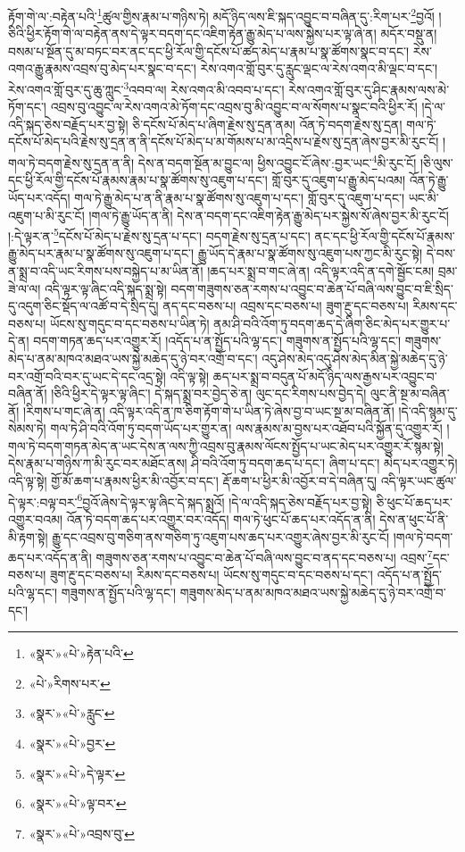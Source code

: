 རྟོག་གེ་ལ་:བརྟེན་པའི་\footnote{«སྣར་»«པེ་»རྟེན་པའི་}ཚུལ་གྱིས་རྣམ་པ་གཉིས་ཏེ། མདོ་ཉིད་ལས་ཇི་སྐད་འབྱུང་བ་བཞིན་དུ་:རིག་པར་\footnote{«པེ་»རིགས་པར་}བྱའོ། །ཅིའི་ཕྱིར་རྟོག་གེ་ལ་བརྟེན་ནས་དེ་ལྟར་བདག་དང་འཇིག་རྟེན་རྒྱུ་མེད་པ་ལས་སྐྱེས་པར་ལྟ་ཞེ་ན། མདོར་བསྡུ་ན། བསམ་པ་སྔོན་དུ་མ་བཏང་བར་ནང་དང་ཕྱི་རོལ་གྱི་དངོས་པོ་ཚད་མེད་པ་རྣམ་པ་སྣ་ཚོགས་སྣང་བ་དང་། རེས་འགའ་རྒྱུ་རྣམས་འབྲས་བུ་མེད་པར་སྣང་བ་དང་། རེས་འགའ་གློ་བུར་དུ་རླུང་ལྡང་ལ་རེས་འགའ་མི་ལྡང་བ་དང་། རེས་འགའ་གློ་བུར་དུ་ཆུ་ཀླུང་\footnote{«སྣར་»«པེ་»རླུང་}འབབ་ལ། རེས་འགའ་མི་འབབ་པ་དང་། རེས་འགའ་གློ་བུར་དུ་ཤིང་རྣམས་ལས་མེ་ཏོག་དང་། འབྲས་བུ་འབྱུང་ལ་རེས་འགའ་མེ་ཏོག་དང་འབྲས་བུ་མི་འབྱུང་བ་ལ་སོགས་པ་སྣང་བའི་ཕྱིར་རོ། །དེ་ལ་འདི་སྐད་ཅེས་བརྗོད་པར་བྱ་སྟེ། ཅི་དངོས་པོ་མེད་པ་ཞིག་རྗེས་སུ་དྲན་ནམ། འོན་ཏེ་བདག་རྗེས་སུ་དྲན། གལ་ཏེ་དངོས་པོ་མེད་པའི་རྗེས་སུ་དྲན་ན་ནི་དངོས་པོ་མེད་པ་མ་གོམས་པ་མ་འདྲིས་པ་རྗེས་སུ་དྲན་ཞེས་བྱར་མི་རུང་ངོ། །གལ་ཏེ་བདག་རྗེས་སུ་དྲན་ན་ནི། དེས་ན་བདག་སྔོན་མ་བྱུང་ལ། ཕྱིས་འབྱུང་ངོ་ཞེས་:བྱར་ཡང་\footnote{«སྣར་»«པེ་»བྱར་}མི་རུང་ངོ། །ཅི་ལུས་དང་ཕྱི་རོལ་གྱི་དངོས་པོ་རྣམས་རྣམ་པ་སྣ་ཚོགས་སུ་འཇུག་པ་དང་། གློ་བུར་དུ་འཇུག་པ་རྒྱུ་མེད་པའམ། འོན་ཏེ་རྒྱུ་ཡོད་པར་འདོད། གལ་ཏེ་རྒྱུ་མེད་པ་ན་ནི་རྣམ་པ་སྣ་ཚོགས་སུ་འཇུག་པ་དང་། གློ་བུར་དུ་འཇུག་པ་དང་། ཡང་མི་འཇུག་པ་མི་རུང་ངོ། །གལ་ཏེ་རྒྱུ་ཡོད་ན་ནི། དེས་ན་བདག་དང་འཇིག་རྟེན་རྒྱུ་མེད་པར་སྐྱེས་སོ་ཞེས་བྱར་མི་རུང་ངོ། །:དེ་ལྟར་ན་\footnote{«སྣར་»«པེ་»དེ་ལྟར་}དངོས་པོ་མེད་པ་རྗེས་སུ་དྲན་པ་དང་། བདག་རྗེས་སུ་དྲན་པ་དང་། ནང་དང་ཕྱི་རོལ་གྱི་དངོས་པོ་རྣམས་རྒྱུ་མེད་པར་རྣམ་པ་སྣ་ཚོགས་སུ་འཇུག་པ་དང་། རྒྱུ་ཡོད་དེ་རྣམ་པ་སྣ་ཚོགས་སུ་འཇུག་པས་ཀྱང་མི་རུང་སྟེ། དེ་བས་ན་སྨྲ་བ་འདི་ཡང་རིགས་པས་བསྐྱེད་པ་མ་ཡིན་ནོ། །ཆད་པར་སྨྲ་བ་གང་ཞེ་ན། འདི་ལྟར་འདི་ན་དགེ་སྦྱོང་ངམ། བྲམ་ཟེ་ལ་ལ། འདི་ལྟར་ལྟ་ཞིང་འདི་སྐད་སྨྲ་སྟེ། བདག་གཟུགས་ཅན་རགས་པ་འབྱུང་བ་ཆེན་པོ་བཞི་ལས་བྱུང་བ་ཇི་སྲིད་དུ་འདུག་ཅིང་སྡོད་ལ་འཚོ་བ་དེ་སྲིད་དུ། ནད་དང་བཅས་པ། འབྲས་དང་བཅས་པ། ཟུག་རྔུ་དང་བཅས་པ། རིམས་དང་བཅས་པ། ཡོངས་སུ་གདུང་བ་དང་བཅས་པ་ཡིན་ཏེ། ནམ་ཤི་བའི་འོག་ཏུ་བདག་ཆད་དེ་ཞིག་ཅིང་མེད་པར་གྱུར་པ་དེ་ན། བདག་གཏན་ཆད་པར་འགྱུར་རོ། །འདོད་པ་ན་སྤྱོད་པའི་ལྷ་དང་། གཟུགས་ན་སྤྱོད་པའི་ལྷ་དང་། གཟུགས་མེད་པ་ནམ་མཁའ་མཐའ་ཡས་སྐྱེ་མཆེད་དུ་ཉེ་བར་འགྲོ་བ་དང་། འདུ་ཤེས་མེད་འདུ་ཤེས་མེད་མིན་སྐྱེ་མཆེད་དུ་ཉེ་བར་འགྲོ་བའི་བར་དུ་ཡང་དེ་དང་འདྲ་སྟེ། འདི་ལྟ་སྟེ། ཆད་པར་སྨྲ་བ་བདུན་པོ་མདོ་ཉིད་ལས་རྒྱས་པར་འབྱུང་བ་བཞིན་ནོ། །ཅིའི་ཕྱིར་དེ་ལྟར་ལྟ་ཞིང་། དེ་སྐད་སྨྲ་བར་བྱེད་ཅེ་ན། ལུང་དང་རིགས་པས་བྱེད་དེ། ལུང་ནི་སྔ་མ་བཞིན་ནོ། །རིགས་པ་གང་ཞེ་ན། འདི་ལྟར་འདི་ན་ཁ་ཅིག་རྟོག་གེ་པ་ཡིན་ཏེ་ཞེས་བྱ་བ་ཡང་སྔ་མ་བཞིན་ནོ། །དེ་འདི་སྙམ་དུ་སེམས་ཏེ། གལ་ཏེ་ཤི་བའི་འོག་ཏུ་བདག་ཡོད་པར་གྱུར་ན། ལས་རྣམས་མ་བྱས་པར་འཐོབ་པའི་སྐྱོན་དུ་འགྱུར་རོ། །གལ་ཏེ་བདག་གཏན་མེད་ན་ཡང་དེས་ན་ལས་ཀྱི་འབྲས་བུ་རྣམས་ལོངས་སྤྱོད་པ་ཡང་མེད་པར་འགྱུར་རོ་སྙམ་སྟེ། དེས་རྣམ་པ་གཉིས་ཀ་མི་རུང་བར་མཐོང་ནས། ཤི་བའི་འོག་ཏུ་བདག་ཆད་པ་དང་། ཞིག་པ་དང་། མེད་པར་འགྱུར་ཏེ། འདི་ལྟ་སྟེ། གྱོ་མོ་ཆག་པ་རྣམས་ཕྱིར་མི་འབྱོར་བ་དང་། རྡོ་ཆག་པ་ཕྱིར་མི་འབྱོར་བ་དེ་བཞིན་དུ། འདི་ལྟར་ཡང་ཚུལ་དེ་ལྟར་:བལྟ་བར་\footnote{«སྣར་»«པེ་»ལྟ་བར་}བྱའོ་ཞེས་དེ་ལྟར་ལྟ་ཞིང་དེ་སྐད་སྨྲའོ། །དེ་ལ་འདི་སྐད་ཅེས་བརྗོད་པར་བྱ་སྟེ། ཅི་ཕུང་པོ་ཆད་པར་འགྱུར་བའམ། འོན་ཏེ་བདག་ཆད་པར་འགྱུར་བར་འདོད། གལ་ཏེ་ཕུང་པོ་ཆད་པར་འདོད་ན་ནི། དེས་ན་ཕུང་པོ་ནི་མི་རྟག་སྟེ། རྒྱུ་དང་འབྲས་བུ་གཅིག་ནས་གཅིག་ཏུ་འཇུག་པས་ཆད་པར་འགྱུར་ཞེས་བྱར་མི་རུང་ངོ། །གལ་ཏེ་བདག་ཆད་པར་འདོད་ན་ནི། གཟུགས་ཅན་རགས་པ་འབྱུང་བ་ཆེན་པོ་བཞི་ལས་བྱུང་བ་ནད་དང་བཅས་པ། འབྲས་\footnote{«སྣར་»«པེ་»འབྲས་བུ་}དང་བཅས་པ། ཟུག་རྔུ་དང་བཅས་པ། རིམས་དང་བཅས་པ། ཡོངས་སུ་གདུང་བ་དང་བཅས་པ་དང་། འདོད་པ་ན་སྤྱོད་པའི་ལྷ་དང་། གཟུགས་ན་སྤྱོད་པའི་ལྷ་དང་། གཟུགས་མེད་པ་ནམ་མཁའ་མཐའ་ཡས་སྐྱེ་མཆེད་དུ་ཉེ་བར་འགྲོ་བ་དང་། 